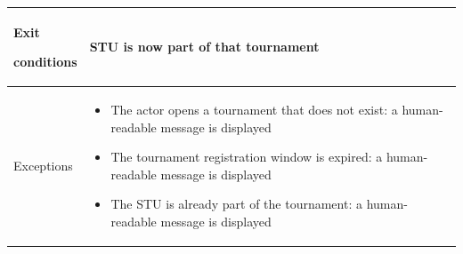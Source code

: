 \begin{center}
\begin{tabular}{| m{2cm} | m{10cm}|}
        Exit \par conditions  & STU is now part of that tournament                                                                         \\ \hline
        Exceptions            & \begin{itemize}
                                    \item The actor opens a tournament that does not exist: a human-readable message is displayed
                                    \item The tournament registration window is expired: a human-readable message is displayed
                                    \item The STU is already part of the tournament: a human-readable message is displayed
                                \end{itemize}               \\ \hline
    \end{tabular}
\end{center}

